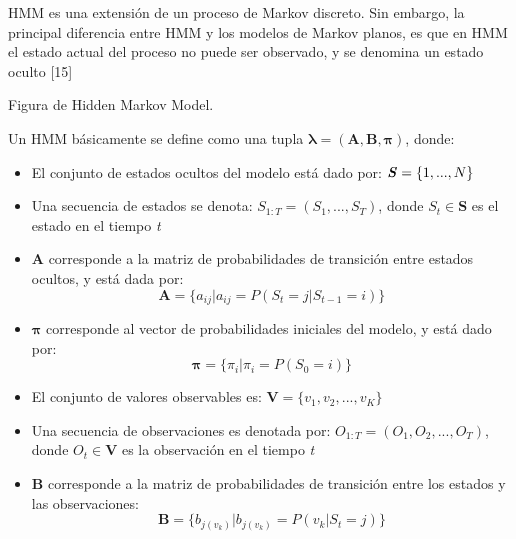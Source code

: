 HMM es una extensi\'on de un proceso de Markov discreto. Sin embargo, la principal diferencia entre HMM y los modelos de Markov planos, es que en HMM el estado actual del proceso no puede ser observado, y se denomina un estado oculto [15]

Figura de Hidden Markov Model.

Un HMM b\'asicamente se define como una tupla $\boldsymbol\lambda = (\textbf{A},\textbf{B},\boldsymbol\pi)$, donde:

\begin{itemize}

\item El conjunto de estados ocultos del modelo est\'a dado por: $\textbf{\textit{S}}=\lbrace 1,...,N \rbrace$

\item Una secuencia de estados se denota: $S_{1:T}=(S_{1},...,S_{T})$, donde $S_{t} \in \textbf{S}$ es el estado en el tiempo \textit{t}

\item \textbf{A} corresponde a la matriz de probabilidades de transici\'on entre estados ocultos, y est\'a dada por:
\begin{equation}
\textbf{A} = \lbrace a_{ij} \vert a_{ij} = P(S_{t} = j \vert S_{t-1} = i) \rbrace
\end{equation}

\item $\boldsymbol\pi$ corresponde al vector de probabilidades iniciales del modelo, y est\'a dado por: 
\begin{equation}
\boldsymbol\pi = \lbrace \pi_{i} \vert \pi_{i} = P(S_{0} = i) \rbrace
\end{equation}

\item El conjunto de valores observables es: $\textbf{V} = \lbrace v_{1}, v_{2},...,v_{K} \rbrace$

\item Una secuencia de observaciones es denotada por: $O_{1:T} = (O_{1},O_{2},...,O_{T})$, donde $O_{t} \in \textbf{V}$ es la observaci\'on en el tiempo \textit{t}

\item \textbf{B} corresponde a la matriz de probabilidades de transici\'on entre los estados y las observaciones:
\begin{equation}
\textbf{B} = \lbrace b_{j(v_{k})} \vert b_{j(v_{k})} = P(v_{k} \vert S_{t} = j) \rbrace
\end{equation}

\end{itemize}


